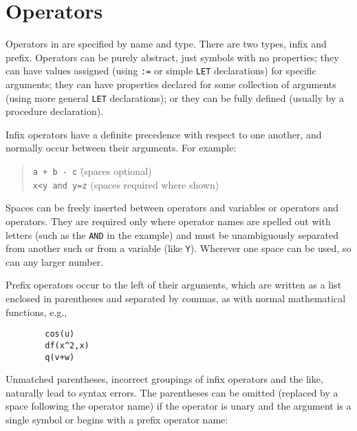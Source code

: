 \section{Operators}

Operators in {\REDUCE} are specified by name and type.
There are two types, infix and prefix.
  Operators can be purely abstract, just symbols
with no properties; they can have values assigned (using {\tt :=} or
simple {\tt LET} declarations) for specific arguments; they can have
properties declared for some collection of arguments (using more general
{\tt LET} declarations); or they can be fully defined (usually by a
procedure declaration).

Infix operators have a definite precedence with
respect to one another, and normally occur between their arguments.
For example:
\begin{quote}
\begin{tabbing}
{\tt a + b - c} \hspace{1.5in} \= (spaces optional) \\
{\tt x<y and y=z} \> (spaces required where shown)
\end{tabbing}
\end{quote}
Spaces can be freely inserted between operators and variables or operators
and operators. They are required only where operator names are spelled out
with letters (such as the {\tt AND} in the example) and must be unambiguously
separated from another such or from a variable (like {\tt Y}). Wherever one
space can be used, so can any larger number.

Prefix operators occur to the left of their arguments, which are written as
a list enclosed in parentheses and separated by commas, as with normal
mathematical functions, e.g.,
\begin{verbatim}
        cos(u)
        df(x^2,x)
        q(v+w)
\end{verbatim}
Unmatched parentheses, incorrect groupings of infix operators
 and the like, naturally lead to syntax errors.  The
parentheses can be omitted (replaced by a space following the
operator name) if the operator is unary and the argument
is a single symbol or begins with a prefix operator name:

